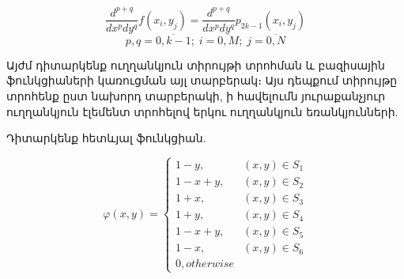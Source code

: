 \documentclass[fleqn, bachelor,subf,12pt,notitlepage]{disser}
\begin{document}
$$ \dfrac{d^{p+q}}{dx^p dy^{q}}f(x_{i}, y_{j})=\dfrac{d^{p+q}}{dx^{p}dy^{q}}p_{2k-1}(x_{i}, y_{j})$$
$$p, q = \overline{0, k-1}; \; i=\overline{0, M};  \;  j=\overline{0, N}$$


\newpage

\noindent Այժմ դիտարկենք ուղղանկյուն տիրույթի տրոհման և բազիսային ֆունկցիաների կառուցման այլ տարբերակ։ Այս դեպքում տիրույթը տրոհենք ըստ նախորդ տարբերակի, ի հավելումն յուրաքանչյուր ուղղանկյուն էլեմենտ տրոհելով երկու ուղղանկյուն եռանկյունների.

Դիտարկենք հետևյալ ֆունկցիան.

$$\varphi \left(x,y\right)=\begin{cases}
1-y, &(x,y) \in S_{1} \\
1-x+y, &(x,y) \in S_{2} \\
1+x, &(x,y) \in S_{3} \\
1+y, &(x,y) \in S_{4} \\
1-x+y, &(x,y) \in S_{5} \\
1-x, &(x,y) \in S_{6}\\
0, otherwise
\end{cases} $$
\end{document}

